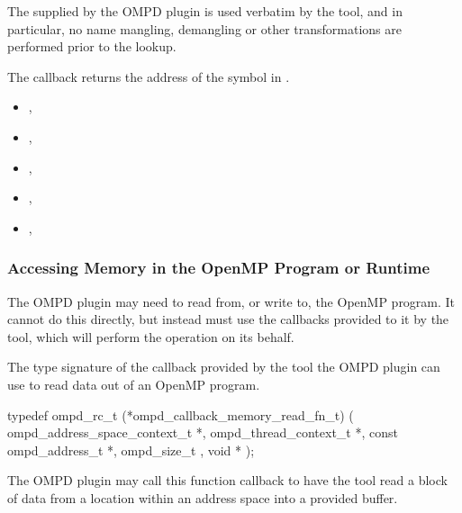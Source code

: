 The  supplied by the OMPD plugin is used verbatim by
the tool, and in particular, no name mangling, demangling
or other transformations are performed prior to the lookup.

The callback returns the address
of the symbol in .

\crossreferences
\begin{itemize}
\item
  , 
\item
  , 
\item
  , 
\item
  , 
\item
  , 
\end{itemize}

\subsubsection{Accessing Memory in the OpenMP Program or Runtime}

The OMPD plugin may need to read from, or write to, the OpenMP program.
It cannot do this directly, but instead must use the callbacks provided
to it by the tool, which will perform the operation
on its behalf.

\label{ompd:ompd_callback_memory_read_fn_t}

\summary

The type signature of the callback provided by the tool the
OMPD plugin can use to read data out of an OpenMP program.



\cspecificstart
\begin{ompSyntax}
typedef ompd_rc_t (*ompd_callback_memory_read_fn_t) (
  ompd_address_space_context_t *,
  ompd_thread_context_t *,
  const ompd_address_t *,
  ompd_size_t                    ,
  void *
);
\end{ompSyntax}
\cspecificend

\descr
The OMPD plugin may call this function callback to have the tool read a block of data from a location within an
address space into a provided buffer.

